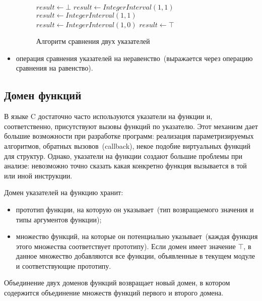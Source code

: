\begin{itemize}
\begin{figure}[h!]
\begin{algorithmic}[1]
\State $result \gets \bot$
    \State $result \gets IntegerInterval(1, 1)$
    \State $result \gets IntegerInterval(1, 1)$
    \State $result \gets IntegerInterval(1, 0)$
\Else
    \State $result \gets \top$
\EndIf

\end{algorithmic}
\caption{Алгоритм сравнения двух указателей}
\label{image:ptrEq}
\end{figure}

\item операция сравнения указателей на неравенство~(выражается через операцию
сравнения на равенство).
\end{itemize}

\subsection{Домен функций}
В языке C достаточно часто используются указатели на функции и, соответственно,
присутствуют вызовы функций по указателю. Этот механизм дает большие 
возможности при разработке программ: реализация параметризируемых алгоритмов, 
обратных вызовов~(callback), некое подобие виртуальных функций для структур. 
Однако, указатели на функции создают большие проблемы при анализе: невозможно 
точно сказать какая конкретно функция вызывается в той или иной инструкции.

Домен указателей на функцию хранит:
\begin{itemize}
\item прототип функции, на которую он указывает~(тип возвращаемого значения
и типы аргументов функции);
\item множество функций, на которые он потенциально указывает~(каждая функция
этого множества соответствует прототипу). Если домен имеет значение $\top$, в
данное множество добавляются все функции, объявленные в текущем модуле и 
соответствующие прототипу.
\end{itemize}

Объединение двух доменов функций возвращает новый домен, в котором содержится
объединение множеств функций первого и второго домена.

